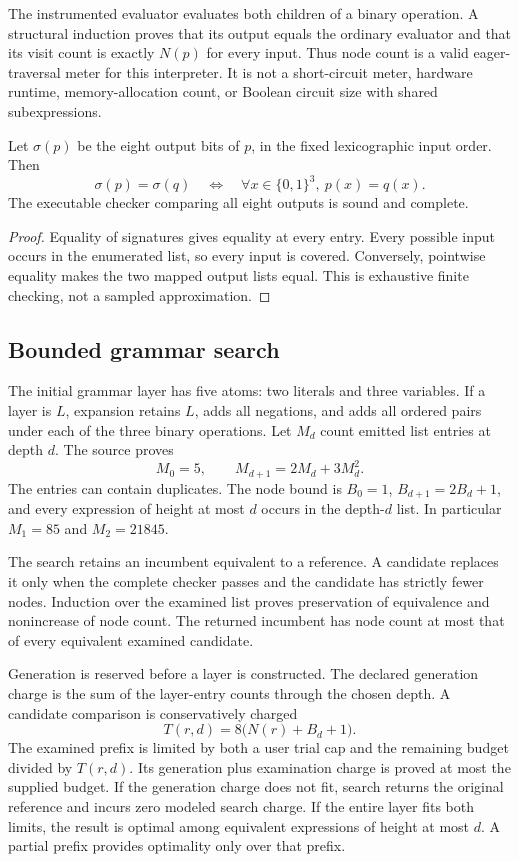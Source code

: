 The instrumented evaluator evaluates both children of a binary operation. A structural induction proves that its output equals the ordinary evaluator and that its visit count is exactly $N(p)$ for every input. Thus node count is a valid eager-traversal meter for this interpreter. It is not a short-circuit meter, hardware runtime, memory-allocation count, or Boolean circuit size with shared subexpressions.

\begin{theorem}
Let $\sigma(p)$ be the eight output bits of $p$, in the fixed lexicographic input order. Then
\[
 \sigma(p)=\sigma(q)\quad\Longleftrightarrow\quad
 \forall x\in\{0,1\}^3,\ p(x)=q(x).
\]
The executable checker comparing all eight outputs is sound and complete.
\end{theorem}
\begin{proof}
Equality of signatures gives equality at every entry. Every possible input occurs in the enumerated list, so every input is covered. Conversely, pointwise equality makes the two mapped output lists equal. This is exhaustive finite checking, not a sampled approximation.
\end{proof}

\subsection{Bounded grammar search}

The initial grammar layer has five atoms: two literals and three variables. If a layer is $L$, expansion retains $L$, adds all negations, and adds all ordered pairs under each of the three binary operations. Let $M_d$ count emitted list entries at depth $d$. The source proves
\[
 M_0=5,\qquad M_{d+1}=2M_d+3M_d^2.
\]
The entries can contain duplicates. The node bound is $B_0=1$, $B_{d+1}=2B_d+1$, and every expression of height at most $d$ occurs in the depth-$d$ list. In particular $M_1=85$ and $M_2=21845$.

The search retains an incumbent equivalent to a reference. A candidate replaces it only when the complete checker passes and the candidate has strictly fewer nodes. Induction over the examined list proves preservation of equivalence and nonincrease of node count. The returned incumbent has node count at most that of every equivalent examined candidate.

Generation is reserved before a layer is constructed. The declared generation charge is the sum of the layer-entry counts through the chosen depth. A candidate comparison is conservatively charged
\[
 T(r,d)=8\bigl(N(r)+B_d+1\bigr).
\]
The examined prefix is limited by both a user trial cap and the remaining budget divided by $T(r,d)$. Its generation plus examination charge is proved at most the supplied budget. If the generation charge does not fit, search returns the original reference and incurs zero modeled search charge. If the entire layer fits both limits, the result is optimal among equivalent expressions of height at most $d$. A partial prefix provides optimality only over that prefix.

